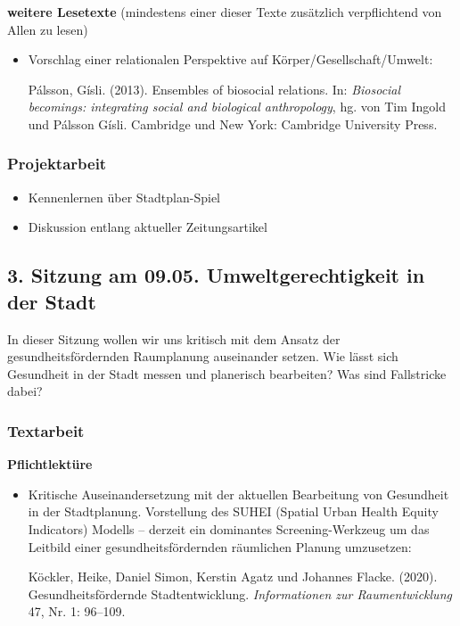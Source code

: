 \documentclass[
  ngerman,
]{article}
\providecommand{\tightlist}{%
  \setlength{\itemsep}{0pt}\setlength{\parskip}{0pt}}
\begin{document}
\textbf{weitere Lesetexte}
(mindestens einer dieser Texte zusätzlich verpflichtend von Allen zu lesen)

\begin{itemize}
\item
  Vorschlag einer relationalen Perspektive auf Körper/Gesellschaft/Umwelt:

  Pálsson, Gísli. (2013). Ensembles of biosocial relations. In: \emph{Biosocial becomings: integrating social and biological anthropology}, hg. von Tim Ingold und Pálsson Gísli. Cambridge und New York: Cambridge University Press.
\end{itemize}

\hypertarget{projektarbeit}{%
\subsubsection*{Projektarbeit}\label{projektarbeit}}

\begin{itemize}
\tightlist
\item
  Kennenlernen über Stadtplan-Spiel
\item
  Diskussion entlang aktueller Zeitungsartikel
\end{itemize}

\hypertarget{sitzung-am-09.05.-umweltgerechtigkeit-in-der-stadt}{%
\subsection*{3. Sitzung am 09.05. \textbar{} Umweltgerechtigkeit in der Stadt}\label{sitzung-am-09.05.-umweltgerechtigkeit-in-der-stadt}}

In dieser Sitzung wollen wir uns kritisch mit dem Ansatz der gesundheitsfördernden Raumplanung auseinander setzen. Wie lässt sich Gesundheit in der Stadt messen und planerisch bearbeiten? Was sind Fallstricke dabei?

\hypertarget{textarbeit-2}{%
\subsubsection*{Textarbeit}\label{textarbeit-2}}

\textbf{Pflichtlektüre}

\begin{itemize}
\item
  Kritische Auseinandersetzung mit der aktuellen Bearbeitung von Gesundheit in der Stadtplanung. Vorstellung des SUHEI (Spatial Urban Health Equity Indicators) Modells -- derzeit ein dominantes Screening-Werkzeug um das Leitbild einer gesundheitsfördernden räumlichen Planung umzusetzen:

  Köckler, Heike, Daniel Simon, Kerstin Agatz und Johannes Flacke. (2020). Gesundheitsfördernde Stadtentwicklung. \emph{Informationen zur Raumentwicklung} 47, Nr. 1: 96--109.
\end{itemize}
\end{document}
